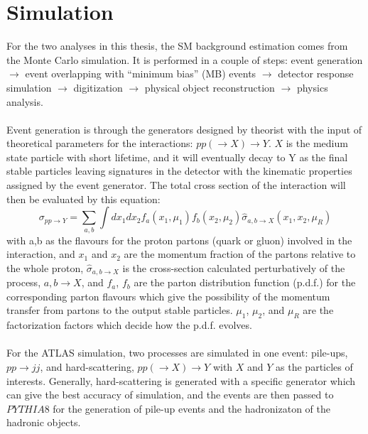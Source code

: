 \section{Simulation}
\label{sec:simulation}
For the two analyses in this thesis, the SM background estimation comes from the Monte Carlo simulation. It is performed in a couple of steps: event generation $\rightarrow$ event overlapping with ``minimum bias'' (MB) events $\rightarrow$  detector response simulation $\rightarrow$ digitization $\rightarrow$ physical object reconstruction $\rightarrow$ physics analysis.
\\
\\Event generation is through the generators designed by theorist with the input of theoretical parameters for the interactions: $pp(\rightarrow X)\rightarrow Y$. $X$ is the medium state particle with short lifetime, and it will eventually decay to Y as the final stable particles leaving signatures in the detector with the kinematic properties assigned by the event generator. The total cross section of the interaction will then be evaluated by this equation: 
\begin{equation}
\sigma_{pp\rightarrow Y} = \sum_{a,b} \int dx_{1}dx_{2}f_{a}(x_{1},\mu_{1})f_{b}(x_{2},\mu_{2})\hat{\sigma}_{a,b\rightarrow X}(x_{1},x_{2},\mu_{R})
\end{equation}
with a,b as the flavours for the proton partons (quark or gluon) involved in the interaction, and $x_{1}$ and $x_{2}$ are the momentum fraction of the partons relative to the whole proton, $\hat{\sigma}_{a,b\rightarrow X}$ is the cross-section calculated perturbatively of the process, $a,b\rightarrow X$, and $f_{a}$, $f_{b}$ are the parton distribution function (p.d.f.) for the corresponding parton flavours which give the possibility of the momentum transfer from partons to the output stable particles. $\mu_{1}$, $\mu_{2}$, and $\mu_{R}$ are the factorization factors which decide how the p.d.f. evolves. 
\\
\\For the ATLAS simulation, two processes are simulated in one event: pile-ups, $pp\rightarrow jj$, and hard-scattering, $pp(\rightarrow X)\rightarrow Y$ with $X$ and $Y$ as the particles of interests. Generally, hard-scattering is generated with a specific generator which can give the best accuracy of simulation, and the events are then passed to $PYTHIA8$ for the generation of pile-up events and the hadronizaton of the hadronic objects. 
\\
